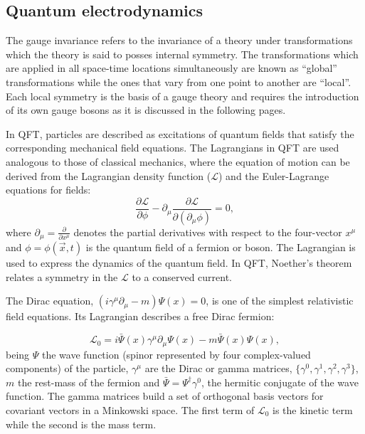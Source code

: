 \subsection{Quantum electrodynamics}
\label{sec:chap1:QED}
The gauge invariance refers to the invariance of a theory under transformations which the theory is said to posses internal symmetry.
The transformations which are applied in all space-time locations simultaneously are known as ``global'' transformations while the ones that vary from 
one point to another are ``local''. Each local symmetry is the basis of a gauge theory and requires the introduction of its own gauge bosons as it is 
discussed in the following pages.

In QFT, particles are described as excitations of quantum fields that satisfy the corresponding mechanical field equations.
The Lagrangians in QFT are used analogous to those of classical mechanics, where the equation of motion can be derived from the Lagrangian density
function ($\mathcal{L}$) and the Euler-Lagrange equations for fields:
\begin{equation*}
\frac{\partial\mathcal{L}}{\partial \phi} - \partial_{\mu} \frac{\partial\mathcal{L}}{\partial (\partial_{\mu} \phi)} = 0 ,
\end{equation*}
where  $\partial_{\mu} = \frac{\partial}{\partial x^{\mu}}$ denotes the partial derivatives with respect to the four-vector $x^{\mu}$ and 
$\phi = \phi(\overrightarrow{x},t)$ is the quantum field of a fermion or boson. %
The Lagrangian is used to express the dynamics of the quantum field. In QFT, Noether's theorem \cite{Noether1918}
relates a symmetry in the $\mathcal{L}$ to a conserved current.

The Dirac equation, $(i \gamma^{\mu}\partial_{\mu} - m)\Psi(x)=0$, is one of the simplest relativistic field equations. Its Lagrangian
describes a free Dirac fermion:

\begin{equation}\label{eq:chap1:Dirac1}
\mathcal{L}_{0} = i \bar{\Psi}(x) \gamma^{\mu} \partial_{\mu} \Psi(x) - m \bar{\Psi}(x) \Psi(x) ,
\end{equation}
being $\Psi$ the wave function (spinor represented by four complex-valued components) of the particle, $\gamma^{\mu}$ 
are the Dirac or gamma matrices, $\{\gamma^{0},\gamma^{1},\gamma^{2}, \gamma^{3} \}$, $m$ the rest-mass of the fermion and $\bar{\Psi}= \Psi^{\dagger}\gamma^{0}$, the hermitic conjugate of the wave function.
The gamma matrices build a set of orthogonal basis vectors for covariant vectors in a Minkowski space.
The first term of $\mathcal{L}_{0}$ is the kinetic term while the second is the mass term. 

